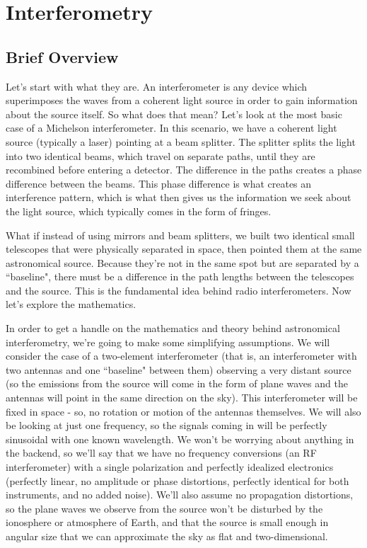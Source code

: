 \chapter{Interferometry}
\label{chap:interferometry}

\section{Brief Overview}
\label{sec:brief-overview}

Let's start with what they are. An interferometer is any device which 
superimposes the waves from a coherent light source in order to gain 
information about the source itself. So what does that mean? Let's look at the 
most basic case of a Michelson interferometer. In this scenario, we have a 
coherent light source (typically a laser) pointing at a beam splitter. The 
splitter splits the light into two identical beams, which travel on separate 
paths, until they are recombined before entering a detector. The difference in 
the paths creates a phase difference between the beams. This phase difference 
is what creates an interference pattern, which is what then gives us the 
information we seek about the light source, which typically comes in the form 
of fringes. 

What if instead of using mirrors and beam splitters, we built two identical 
small telescopes that were physically separated in space, then pointed them at 
the same astronomical source. Because they're not in the same spot but are 
separated by a ``baseline", there must be a difference in the path lengths 
between the telescopes and the source. This is the fundamental idea behind 
radio interferometers. Now let's explore the mathematics.

In order to get a handle on the mathematics and theory behind astronomical 
interferometry, we're going to make some simplifying assumptions. We will 
consider the case of a two-element interferometer (that is, an interferometer 
with two antennas and one ``baseline" between them) observing a very distant 
source (so the emissions from the source will come in the form of plane waves 
and the antennas will point in the same direction on the sky).  This 
interferometer will be fixed in space - so, no rotation or motion of the 
antennas themselves.  We will also be looking at just one frequency, so the 
signals coming in will be perfectly sinusoidal with one known wavelength.  We 
won't be worrying about anything in the backend, so we'll say that we have no 
frequency conversions (an RF interferometer) with a single polarization and 
perfectly idealized electronics (perfectly linear, no amplitude or phase 
distortions, perfectly identical for both instruments, and no added noise).  
We'll also assume no propagation distortions, so the plane waves we observe 
from the source won't be disturbed by the ionosphere or atmosphere of Earth, 
and that the source is small enough in angular size that we can approximate the 
sky as flat and two-dimensional. 

